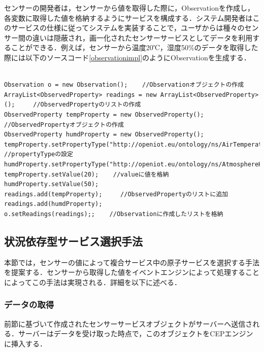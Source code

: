 \documentclass{kuisthesis}			%
\begin{document}
センサーの開発者は，センサーから値を取得した際に，Observationを作成し，各変数に取得した値を格納するようにサービスを構成する．システム開発者はこのサービスの仕様に従ってシステムを実装することで，ユーザからは種々のセンサー間の違いは隠蔽され，画一化されたセンサーサービスとしてデータを利用することができる．例えば，センサーから温度20℃，湿度50\%のデータを取得した際には以下のソースコード\ref{observationimpl}のようにObservationを生成する．\\
\\

\begin{lstlisting}[caption=Observation生成例,label=observationimpl]
Observation o = new Observation();    //Observationオブジェクトの作成
ArrayList<ObservedProperty> readings = new ArrayList<ObservedProperty>();     //ObservedPropertyのリストの作成
ObservedProperty tempProperty = new ObservedProperty();    //ObservedPropertyオブジェクトの作成
ObservedProperty humdProperty = new ObservedProperty();    
tempProperty.setPropertyType("http://openiot.eu/ontology/ns/AirTemperature");    　//propertyTypeの設定
humdProperty.setPropertyType("http://openiot.eu/ontology/ns/AtmosphereHumidity");
tempProperty.setValue(20);    //valueに値を格納
humdProperty.setValue(50);
readings.add(tempProperty);     //ObservedPropertyのリストに追加
readings.add(humdProperty);
o.setReadings(readings);;    //Observationに作成したリストを格納
\end{lstlisting}



\subsection{状況依存型サービス選択手法}
本節では，センサーの値によって複合サービス中の原子サービスを選択する手法を提案する．センサーから取得した値をイベントエンジンによって処理することによってこの手法は実現される．詳細を以下に述べる．

\subsubsection{データの取得}
前節に基づいて作成されたセンサーサービスオブジェクトがサーバーへ送信される．サーバーはデータを受け取った時点で，このオブジェクトをCEPエンジンに挿入する．
\end{document}
